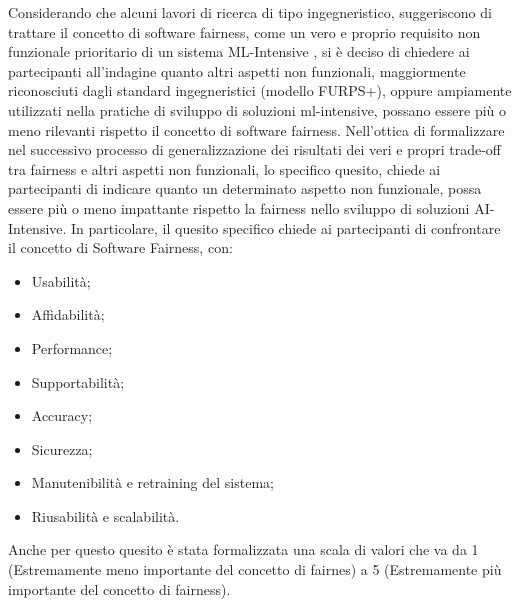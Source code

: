 	\begin{center}
		\hspace*{-5mm}%
	\end{center}
	
	Considerando che alcuni lavori di ricerca di tipo ingegneristico, suggeriscono di trattare il concetto di software fairness, come un vero e proprio requisito non funzionale prioritario di un sistema ML-Intensive \cite{brun2018software}, si è deciso di chiedere ai partecipanti all'indagine quanto altri aspetti non funzionali, maggiormente riconosciuti dagli standard ingegneristici (modello FURPS+), oppure ampiamente utilizzati nella pratiche di sviluppo di soluzioni ml-intensive, possano essere più o meno rilevanti rispetto il concetto di software fairness. Nell'ottica di formalizzare nel successivo processo di generalizzazione dei risultati dei veri e propri trade-off tra fairness e altri aspetti non funzionali, lo specifico quesito, chiede ai partecipanti di indicare quanto un determinato aspetto non funzionale, possa essere più o meno impattante rispetto la fairness nello sviluppo di soluzioni AI-Intensive. In particolare, il quesito specifico chiede ai partecipanti di confrontare il concetto di Software Fairness, con:
	
	\begin{itemize}
		\item Usabilità;
		\item Affidabilità;
		\item Performance;
		\item Supportabilità;
		\item Accuracy;
		\item Sicurezza;
		\item Manutenibilità e retraining del sistema;
		\item Riusabilità e scalabilità.
	\end{itemize}
	
	Anche per questo quesito è stata formalizzata una scala di valori che va da 1 (Estremamente meno importante del concetto di fairnes) a 5 (Estremamente più importante del concetto di fairness).\\
    
